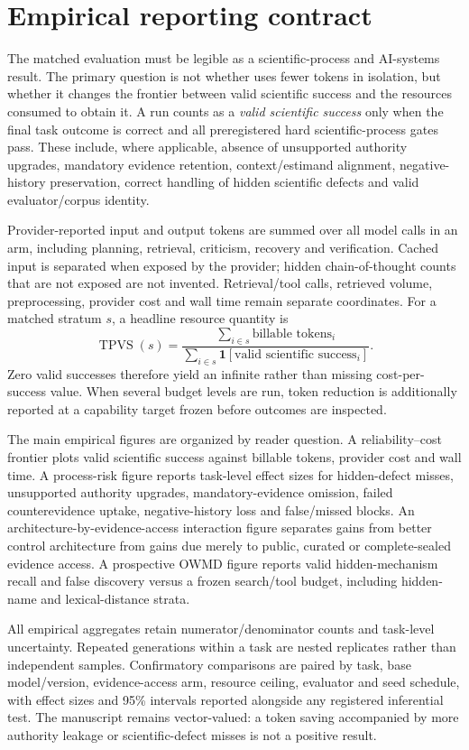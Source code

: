 \section{Empirical reporting contract}

The matched evaluation must be legible as a scientific-process and AI-systems result. The primary question is not whether \RAKL{} uses fewer tokens in isolation, but whether it changes the frontier between valid scientific success and the resources consumed to obtain it. A run counts as a \emph{valid scientific success} only when the final task outcome is correct and all preregistered hard scientific-process gates pass. These include, where applicable, absence of unsupported authority upgrades, mandatory evidence retention, context/estimand alignment, negative-history preservation, correct handling of hidden scientific defects and valid evaluator/corpus identity.

Provider-reported input and output tokens are summed over all model calls in an arm, including planning, retrieval, criticism, recovery and verification. Cached input is separated when exposed by the provider; hidden chain-of-thought counts that are not exposed are not invented. Retrieval/tool calls, retrieved volume, preprocessing, provider cost and wall time remain separate coordinates. For a matched stratum $s$, a headline resource quantity is
\[
\operatorname{TPVS}(s)=
\frac{\sum_{i\in s}\text{billable tokens}_i}
{\sum_{i\in s}\mathbf 1[\text{valid scientific success}_i]}.
\]
Zero valid successes therefore yield an infinite rather than missing cost-per-success value. When several budget levels are run, token reduction is additionally reported at a capability target frozen before outcomes are inspected.

The main empirical figures are organized by reader question. A reliability--cost frontier plots valid scientific success against billable tokens, provider cost and wall time. A process-risk figure reports task-level effect sizes for hidden-defect misses, unsupported authority upgrades, mandatory-evidence omission, failed counterevidence uptake, negative-history loss and false/missed blocks. An architecture-by-evidence-access interaction figure separates gains from better control architecture from gains due merely to public, curated or complete-sealed evidence access. A prospective OWMD figure reports valid hidden-mechanism recall and false discovery versus a frozen search/tool budget, including hidden-name and lexical-distance strata.

All empirical aggregates retain numerator/denominator counts and task-level uncertainty. Repeated generations within a task are nested replicates rather than independent samples. Confirmatory comparisons are paired by task, base model/version, evidence-access arm, resource ceiling, evaluator and seed schedule, with effect sizes and 95\% intervals reported alongside any registered inferential test. The manuscript remains vector-valued: a token saving accompanied by more authority leakage or scientific-defect misses is not a positive result.

